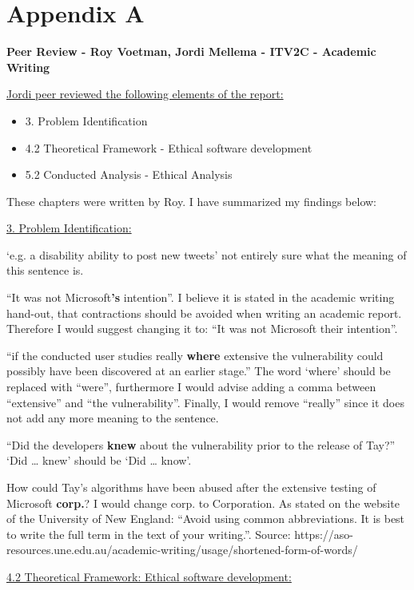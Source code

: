 \chapter*{Appendix A}

\textbf{Peer Review - Roy Voetman, Jordi Mellema - ITV2C - Academic Writing}

\underline{Jordi peer reviewed the following elements of the report:}

\begin{itemize}
    \item 3. Problem Identification
    \item 4.2 Theoretical Framework - Ethical software development
    \item 5.2 Conducted Analysis - Ethical Analysis
\end{itemize}

These chapters were written by Roy. I have summarized my findings below:

\underline{3. Problem Identification:}

‘e.g. a disability ability to post new tweets’ not entirely sure what the meaning of this sentence is.

“It was not Microsoft\textbf{’s} intention”. I believe it is stated in the academic writing hand-out, that contractions should be avoided when writing an academic report. Therefore I would suggest changing it to: “It was not Microsoft their intention”.

“if the conducted user studies really \textbf{where} extensive the vulnerability could possibly have been discovered at an earlier stage.” The word ‘where’ should be replaced with “were”, furthermore I would advise adding a comma between “extensive” and “the vulnerability”. Finally, I would remove “really” since it does not add any more meaning to the sentence.

“Did the developers \textbf{knew} about the vulnerability prior to the release of Tay?”
‘Did … knew’ should be ‘Did … know’.

How could Tay’s algorithms have been abused after the extensive testing of Microsoft \textbf{corp.}? I would change corp. to Corporation. As stated on the website of the University of New England: “Avoid using common abbreviations. It is best to write the full term in the text of your writing.”. Source: https://aso-resources.une.edu.au/academic-writing/usage/shortened-form-of-words/

\underline{4.2 Theoretical Framework: Ethical software development:}

